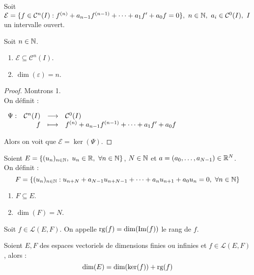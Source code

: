Soit $\mathcal{E} = \{ f \in \mathcal{C}^n(I) : f^{(n)} + a_{n - 1} f^{(n - 1)} + \cdots + a_1 f' + a_0 f = 0 \},\ n \in \mathbb{N},\ a_i \in \mathcal{C}^0(I),\ I$ un intervalle ouvert.

\begin{proposition}
    Soit $n \in \mathbb{N}$.
    \begin{multicols}{2}
        \begin{enumerate}
            \item $\mathcal{E} \subseteq \mathcal{C}^n(I)$.
            \item $\dim(\varepsilon) = n$.
        \end{enumerate}
    \end{multicols}
\end{proposition}

\begin{proof}
	Montrons 1. \\
	On définit :
	\begin{center}
		$\begin{array}{rrcl} \Psi : & \mathcal{C}^n(I) & \longrightarrow & \mathcal{C}^0(I) \\ & f & \longmapsto & f^{(n)} + a_{n-1}f^{(n-1)} + \cdots + a_1 f' + a_0 f \end{array}$
	\end{center}
	Alors on voit que $\mathcal{E} = \ker(\Psi)$.
\end{proof}

Soient $E = \{ (u_n)_{n \in \mathbb{N}},\ u_n \in \mathbb{R},\ \forall n \in \mathbb{N} \}$, $N \in \mathbb{N}$ et $a = (a_0, \ldots, a_{N-1}) \in \mathbb{R}^N$.
\\
On définit :
\[ F = \{ (u_n)_{n \in \N} : u_{n + N} + a_{N-1} u_{n + N - 1} + \cdots + a_n u_{n+1} + a_0 u_n = 0,\ \forall n \in \N \} \]

\begin{theorem}
	\begin{multicols}{2}
		\begin{enumerate}
			\item $F \subseteq E$.
			\item $\dim(F) = N$.
		\end{enumerate}
	\end{multicols}
\end{theorem}

\begin{definition}
    Soit $f \in \mathcal{L}(E, F)$. On appelle $\operatorname{rg}(f) = \dim(\Im(f))$ le rang de $f$.
\end{definition}

\begin{theorem}
    Soient $E, F$ des espaces vectoriels de dimensions finies ou infinies et $f \in \mathcal{L}(E, F)$, alors :
    \[ \dim(E) = \dim(\ker(f)) + \operatorname{rg}(f) \]
\end{theorem}


